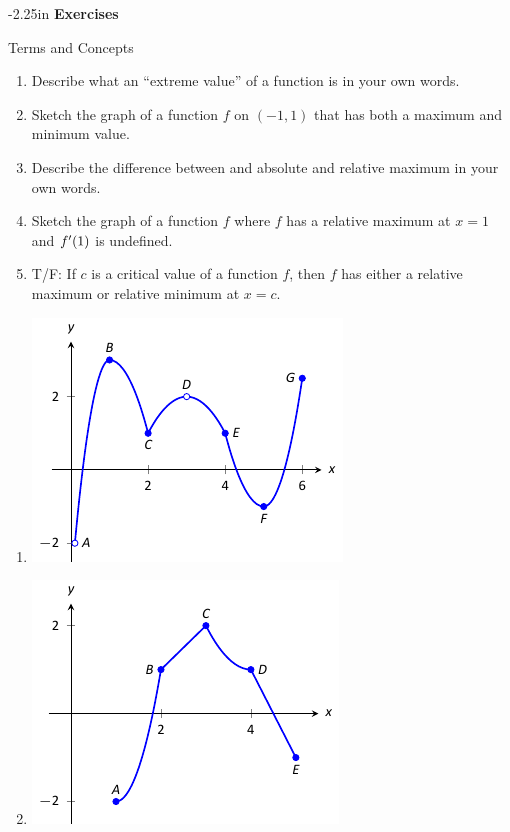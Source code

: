 \begin{adjustwidth*}{}{-2.25in}
\textbf{{\large Exercises}}
\setlength{\columnsep}{25pt}
\begin{multicols*}{2}
\noindent Terms and Concepts \small
\begin{enumerate}[1)]
\item Describe what an ``extreme value'' of a function is in your own words.
\item Sketch the graph of a function $f$ on $(-1,1)$ that has both a maximum and minimum value.
\item Describe the difference between and absolute and relative maximum in your own words.
\item Sketch the graph of a function $f$ where $f$ has a relative maximum at $x=1$ and $f'(1)$ is undefined.
\item T/F: If $c$ is a critical value of a function $f$, then $f$ has either a relative maximum or relative minimum at $x=c$. 
\end{enumerate} 

 \small


\begin{enumerate}[1),resume]
\item \begin{minipage}{\linewidth}
\includegraphics[scale=.8]{figures/fig03_01_ex_06}
\end{minipage}

\item \begin{minipage}{\linewidth}
\includegraphics[scale=.8]{figures/fig03_01_ex_07}
\end{minipage}
\end{enumerate}


\end{multicols*}
\end{adjustwidth*}
